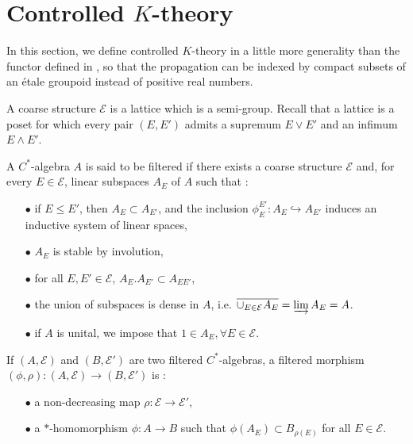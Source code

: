 \section{Controlled $K$-theory}

In this section, we define controlled $K$-theory in a little more generality than the functor defined in \cite{OY2}, so that the propagation can be indexed by compact subsets of an étale groupoid instead of positive real numbers.\\

\begin{definition}
A coarse structure $\mathcal E$ is a lattice which is a semi-group. %
Recall that a lattice is a poset for which every pair $(E,E')$ admits a supremum $E\vee E'$ and an infimum $E\wedge E'$.
\end{definition}

\begin{definition}
A $C^*$-algebra $A$ is said to be filtered if there exists a coarse structure $\mathcal E$ and, for every $E\in \mathcal E$, linear subspaces $A_E$ of $A$ such that :\\
\begin{itemize}
\item[$\bullet$] if $E \leq E'$, then $A_E\subset A_{E'}$, and the inclusion $\phi_E^{E'}: A_E\hookrightarrow A_{E'}$ induces an inductive system of linear spaces,
\item[$\bullet$] $A_E$ is stable by involution,
\item[$\bullet$] for all $E,E'\in\mathcal E$, $A_E.A_{E'}\subset A_{EE'}$,
\item[$\bullet$] the union of subspaces is dense in $A$, i.e. $\overline{\cup_{E\in\mathcal E}A_E} = \varinjlim A_E = A$.
\item[$\bullet$] if $A$ is unital, we impose that $1\in A_E,\forall E\in\mathcal E$.\\
\end{itemize}
\end{definition}

If $(A,\mathcal E)$ and $(B,\mathcal E')$ are two filtered $C^*$-algebras, a filtered morphism $(\phi,\rho): (A,\mathcal E)\rightarrow (B,\mathcal E')$ is :
\begin{itemize}
\item[$\bullet$] a non-decreasing map $\rho : \mathcal E\rightarrow \mathcal E'$,
\item[$\bullet$] a $*$-homomorphism $\phi: A\rightarrow B$ such that $\phi (A_E)\subset B_{\rho(E)}$ for all $E\in\mathcal E$.
\end{itemize}

